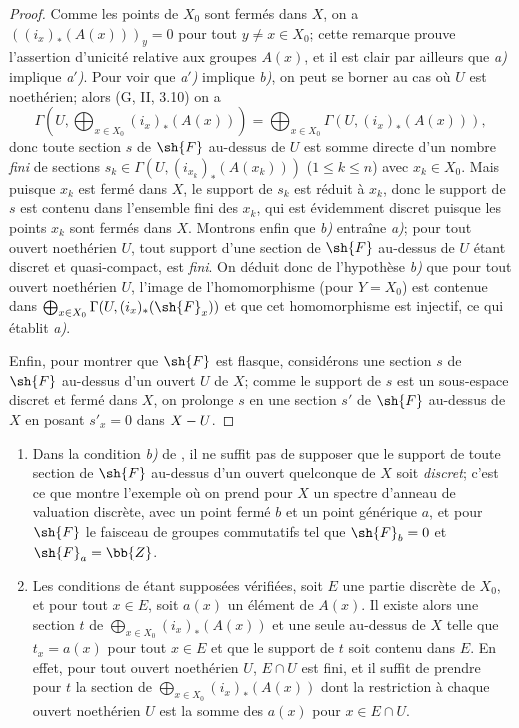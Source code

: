 \begin{proof}
Comme les points de $X_0$ sont fermés dans $X$, on a $((i_x)_*(A(x)))_y=0$ pour tout
$y\neq x\in X_0$;
cette remarque prouve l'assertion d'unicité relative aux groupes $A(x)$, et il est clair par ailleurs que \emph{a)} implique \emph{a$'$)}.
Pour voir que \emph{a$'$)} implique \emph{b)}, on peut se borner au cas où $U$ est noethérien;
alors (G, II, 3.10) on a
\[
  \Gamma(U,\bigoplus_{x\in X_0}(i_x)_*(A(x)))
  =\bigoplus_{x\in X_0}\Gamma(U,(i_x)_*(A(x))),
\]
donc toute section $s$ de $\sh{F}$ au-dessus de $U$ est somme directe d'un nombre \emph{fini} de sections $s_k\in\Gamma(U,(i_{x_k})_*(A(x_k)))$ ($1\leq k\leq n$) avec $x_k\in X_0$.
Mais puisque $x_k$ est fermé dans $X$, le support de $s_k$ est réduit à $x_k$, donc le support de $s$ est contenu dans l'ensemble fini des $x_k$, qui est évidemment discret puisque les points $x_k$ sont fermés dans $X$.
Montrons enfin que \emph{b)} entraîne \emph{a)};
pour tout ouvert noethérien $U$, tout support d'une section de $\sh{F}$ au-dessus de $U$ étant discret et quasi-compact, est \emph{fini}.
On déduit donc de l'hypothèse \emph{b)} que pour tout ouvert noethérien $U$, l'image de l'homomorphisme  (pour $Y=X_0$) est contenue dans $\bigoplus_{x\in X_0}\Gamma(U,(i_x)_*(\sh{F}_x))$ et que cet homomorphisme est injectif, ce qui établit \emph{a)}.

Enfin, pour montrer que $\sh{F}$ est flasque, considérons une section $s$ de $\sh{F}$ au-dessus d'un ouvert $U$ de $X$;
comme le support de $s$ est un sous-espace discret et fermé dans $X$, on prolonge $s$ en une section $s'$ de $\sh{F}$ au-dessus de $X$ en posant $s'_x=0$ dans $X- U$.
\end{proof}

\begin{remarks}[21.9.3]
\label{IV.21.9.3}
\begin{enumerate}[label=(\roman*)]
  \item Dans la condition \emph{b)} de , il ne suffit pas de supposer que le support de toute section de $\sh{F}$ au-dessus d'un ouvert quelconque de $X$ soit \emph{discret};
c'est ce que montre l'exemple où on prend pour $X$ un spectre d'anneau de valuation discrète, avec un point fermé $b$ et un point générique $a$, et pour $\sh{F}$ le faisceau de groupes commutatifs tel que $\sh{F}_b=0$ et $\sh{F}_a=\bb{Z}$.

  \item Les conditions de  étant supposées vérifiées, soit $E$ une partie discrète de $X_0$, et pour tout $x\in E$, soit $a(x)$ un élément de $A(x)$.
Il existe alors une section $t$ de $\bigoplus_{x\in X_0}(i_x)_*(A(x))$ et une seule au-dessus de $X$ telle que $t_x=a(x)$ pour tout $x\in E$ et que le support de $t$ soit contenu dans $E$.
En effet, pour tout ouvert noethérien $U$, $E\cap U$ est fini, et il suffit de prendre pour $t$ la section de $\bigoplus_{x\in X_0}(i_x)_*(A(x))$ dont la restriction à chaque ouvert noethérien $U$ est la somme des $a(x)$ pour $x\in E\cap U$.
\end{enumerate}
\end{remarks}

